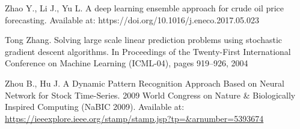 \documentclass[a4paper,11pt,oneside]{article}
\theoremstyle{plain}
\theoremstyle{definition}
\begin{document}
\begin{thebibliography}{bibliography}
Zhao Y., Li J., Yu L. A deep learning ensemble approach for crude oil price 
forecasting.  Available at: https://doi.org/10.1016/j.eneco.2017.05.023

Tong Zhang. Solving large scale linear prediction problems using stochastic gradient descent algorithms. In Proceedings of the Twenty-First International Conference on Machine Learning (ICML-04), pages 919–926, 2004

Zhou B., Hu J. A Dynamic Pattern Recognition Approach Based on Neural Network for Stock Time-Series. 2009 World Congress on Nature \& Biologically Inspired Computing (NaBIC 
2009). Available at:\url{ https://ieeexplore.ieee.org/stamp/stamp.jsp?tp=&arnumber=5393674}

\end{thebibliography}
\end{document}
